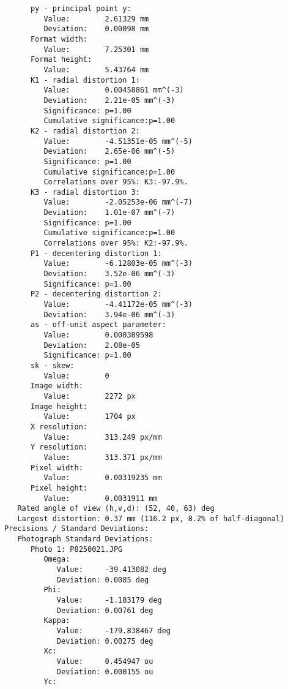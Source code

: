 \documentclass{article}
\begin{document}
\begin{verbatim}
            py - principal point y:
               Value:        2.61329 mm
               Deviation:    0.00098 mm
            Format width:
               Value:        7.25301 mm
            Format height:
               Value:        5.43764 mm
            K1 - radial distortion 1:
               Value:        0.00458861 mm^(-3)
               Deviation:    2.21e-05 mm^(-3)
               Significance: p=1.00
               Cumulative significance:p=1.00
            K2 - radial distortion 2:
               Value:        -4.51351e-05 mm^(-5)
               Deviation:    2.65e-06 mm^(-5)
               Significance: p=1.00
               Cumulative significance:p=1.00
               Correlations over 95%: K3:-97.9%.
            K3 - radial distortion 3:
               Value:        -2.05253e-06 mm^(-7)
               Deviation:    1.01e-07 mm^(-7)
               Significance: p=1.00
               Cumulative significance:p=1.00
               Correlations over 95%: K2:-97.9%.
            P1 - decentering distortion 1:
               Value:        -6.12803e-05 mm^(-3)
               Deviation:    3.52e-06 mm^(-3)
               Significance: p=1.00
            P2 - decentering distortion 2:
               Value:        -4.41172e-05 mm^(-3)
               Deviation:    3.94e-06 mm^(-3)
            as - off-unit aspect parameter:
               Value:        0.000389598 
               Deviation:    2.08e-05 
               Significance: p=1.00
            sk - skew:
               Value:        0 
            Image width:
               Value:        2272 px
            Image height:
               Value:        1704 px
            X resolution:
               Value:        313.249 px/mm
            Y resolution:
               Value:        313.371 px/mm
            Pixel width:
               Value:        0.00319235 mm
            Pixel height:
               Value:        0.0031911 mm
         Rated angle of view (h,v,d): (52, 40, 63) deg
         Largest distortion: 0.37 mm (116.2 px, 8.2% of half-diagonal)
      Precisions / Standard Deviations:
         Photograph Standard Deviations:
            Photo 1: P8250021.JPG
               Omega:
                  Value:     -39.413082 deg
                  Deviation: 0.0085 deg
               Phi:
                  Value:     -1.183179 deg
                  Deviation: 0.00761 deg
               Kappa:
                  Value:     -179.838467 deg
                  Deviation: 0.00275 deg
               Xc:
                  Value:     0.454947 ou
                  Deviation: 0.000155 ou
               Yc:

\end{verbatim}
\end{document}
